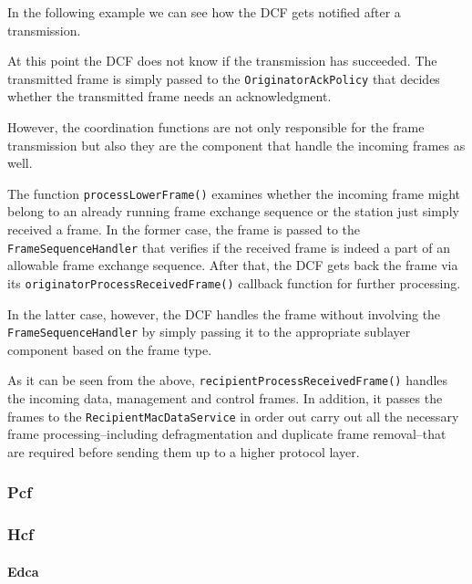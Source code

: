 In the following example we can see how the DCF gets notified after a transmission.


At this point the DCF does not know if the transmission has succeeded. The transmitted frame is simply passed to the \texttt{OriginatorAckPolicy} that decides whether the transmitted frame needs an acknowledgment.

However, the coordination functions are not only responsible for the frame transmission but also they are the component that handle the incoming frames as well.

The function \texttt{processLowerFrame()} examines whether the incoming frame might belong to an already running frame exchange sequence or the station just simply received a frame. In the former case, the frame is passed to the \texttt{FrameSequenceHandler} that verifies if the received frame is indeed a part of an allowable frame exchange sequence. After that, the DCF gets back the frame via its \texttt{originatorProcessReceivedFrame()} callback function for further processing.

In the latter case, however, the DCF handles the frame without involving the \texttt{FrameSequenceHandler} by simply passing it to the appropriate sublayer component based on the frame type.


As it can be seen from the above, \texttt{recipientProcessReceivedFrame()} handles the incoming data, management and control frames. In addition, it passes the frames to the \texttt{RecipientMacDataService} in order out carry out all the necessary frame processing\---including defragmentation and duplicate frame removal\---that are required before sending them up to a higher protocol layer.
%
\subsubsection{Pcf}
%

%
\subsubsection{Hcf}
%

%
\paragraph{Edca}
%


